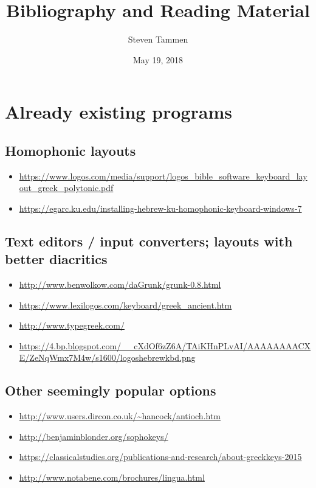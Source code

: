 \documentclass[11pt]{article}
\author{Steven Tammen}
\date{May 19, 2018}
\title{Bibliography and Reading Material}
\begin{document}
\maketitle
\setcounter{tocdepth}{2}
\tableofcontents


\section{Already existing programs}
\label{sec:orga2bca51}

\subsection{Homophonic layouts}
\label{sec:org7329f89}
\begin{itemize}
\item \url{https://www.logos.com/media/support/logos\_bible\_software\_keyboard\_layout\_greek\_polytonic.pdf}
\item \url{https://egarc.ku.edu/installing-hebrew-ku-homophonic-keyboard-windows-7}
\end{itemize}

\subsection{Text editors / input converters; layouts with better diacritics}
\label{sec:org3ce77b1}

\begin{itemize}
\item \url{http://www.benwolkow.com/daGrunk/grunk-0.8.html}
\item \url{https://www.lexilogos.com/keyboard/greek\_ancient.htm}
\item \url{http://www.typegreek.com/}
\item \url{https://4.bp.blogspot.com/\_\_cXdOf6zZ6A/TAiKHnPLvAI/AAAAAAAACXE/ZeNqWmx7M4w/s1600/logoshebrewkbd.png}
\end{itemize}

\subsection{Other seemingly popular options}
\label{sec:orgfd0b0c1}

\begin{itemize}
\item \url{http://www.users.dircon.co.uk/\~hancock/antioch.htm}
\item \url{http://benjaminblonder.org/sophokeys/}
\item \url{https://classicalstudies.org/publications-and-research/about-greekkeys-2015}
\item \url{http://www.notabene.com/brochures/lingua.html}
\end{itemize}
\end{document}
